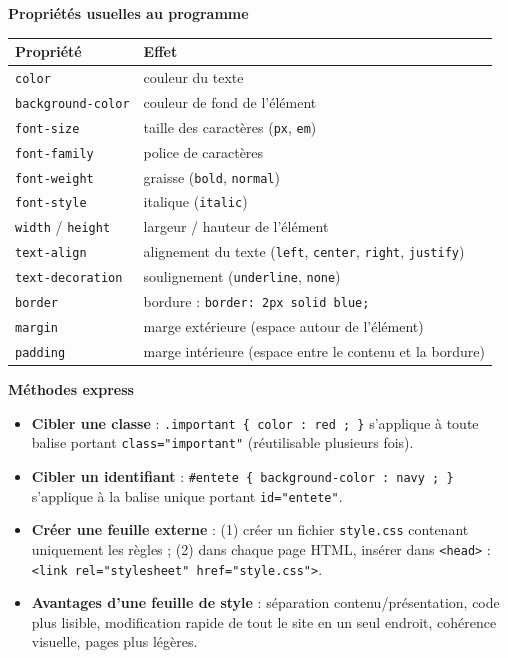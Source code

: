 \documentclass[11pt]{article}
\begin{document}
\begin{bilan}
\textbf{Propriétés usuelles au programme}
\begin{center}
\begin{tabularx}{\linewidth}{|l|X|}
\hline
\rowcolor{popblueL} \textbf{Propriété} & \textbf{Effet} \\
\hline
\texttt{color} & couleur du texte \\
\hline
\texttt{background-color} & couleur de fond de l'élément \\
\hline
\texttt{font-size} & taille des caractères (\texttt{px}, \texttt{em}) \\
\hline
\texttt{font-family} & police de caractères \\
\hline
\texttt{font-weight} & graisse (\texttt{bold}, \texttt{normal}) \\
\hline
\texttt{font-style} & italique (\texttt{italic}) \\
\hline
\texttt{width} / \texttt{height} & largeur / hauteur de l'élément \\
\hline
\texttt{text-align} & alignement du texte (\texttt{left}, \texttt{center}, \texttt{right}, \texttt{justify}) \\
\hline
\texttt{text-decoration} & soulignement (\texttt{underline}, \texttt{none}) \\
\hline
\texttt{border} & bordure : \texttt{border: 2px solid blue;} \\
\hline
\texttt{margin} & marge extérieure (espace autour de l'élément) \\
\hline
\texttt{padding} & marge intérieure (espace entre le contenu et la bordure) \\
\hline
\end{tabularx}
\end{center}

\textbf{Méthodes express}
\begin{itemize}
  \item \textbf{Cibler une classe} : \texttt{.important \{ color : red ; \}} s'applique à toute balise portant \texttt{class="important"} (réutilisable plusieurs fois).
  \item \textbf{Cibler un identifiant} : \texttt{\#entete \{ background-color : navy ; \}} s'applique à la balise unique portant \texttt{id="entete"}.
  \item \textbf{Créer une feuille externe} : (1) créer un fichier \texttt{style.css} contenant uniquement les règles ; (2) dans chaque page HTML, insérer dans \texttt{<head>} : \texttt{<link rel="stylesheet" href="style.css">}.
  \item \textbf{Avantages d'une feuille de style} : séparation contenu/présentation, code plus lisible, modification rapide de tout le site en un seul endroit, cohérence visuelle, pages plus légères.
\end{itemize}
\end{bilan}
\end{document}
